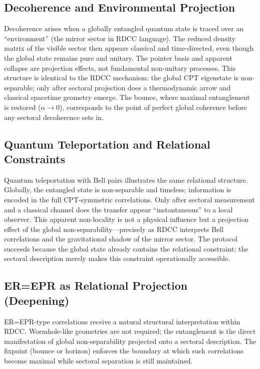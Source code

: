 \documentclass[11pt,a4paper]{article}
\begin{document}
\subsection{Decoherence and Environmental Projection}

Decoherence arises when a globally entangled quantum state is traced over an “environment” (the mirror sector in RDCC language). The reduced density matrix of the visible sector then appears classical and time-directed, even though the global state remains pure and unitary. The pointer basis and apparent collapse are projection effects, not fundamental non-unitary processes. This structure is identical to the RDCC mechanism: the global CPT eigenstate is non-separable; only after sectoral projection does a thermodynamic arrow and classical spacetime geometry emerge. The bounce, where maximal entanglement is restored ($\alpha \to 0$), corresponds to the point of perfect global coherence before any sectoral decoherence sets in.

\subsection{Quantum Teleportation and Relational Constraints}

Quantum teleportation with Bell pairs illustrates the same relational structure. Globally, the entangled state is non-separable and timeless; information is encoded in the full CPT-symmetric correlations. Only after sectoral measurement and a classical channel does the transfer appear “instantaneous” to a local observer. This apparent non-locality is not a physical influence but a projection effect of the global non-separability—precisely as RDCC interprets Bell correlations and the gravitational shadow of the mirror sector. The protocol succeeds because the global state already contains the relational constraint; the sectoral description merely makes this constraint operationally accessible.

\subsection{ER=EPR as Relational Projection (Deepening)}

ER=EPR-type correlations receive a natural structural interpretation within RDCC. Wormhole-like geometries are not required; the entanglement is the direct manifestation of global non-separability projected onto a sectoral description. The fixpoint (bounce or horizon) enforces the boundary at which such correlations become maximal while sectoral separation is still maintained.
\end{document}
